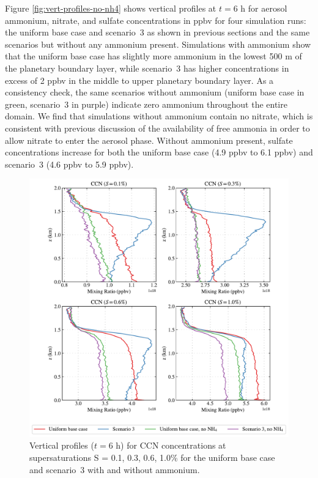 Figure \ref{fig:vert-profiles-no-nh4} shows vertical profiles at $t=6$ h for aerosol ammonium, nitrate, and sulfate concentrations in ppbv for four simulation runs: the uniform base case and scenario~3 as shown in previous sections and the same scenarios but without any ammonium present. Simulations with ammonium show that the uniform base case has slightly more ammonium in the lowest 500 m of the planetary boundary layer, while scenario~3 has higher concentrations in excess of 2 ppbv in the middle to upper planetary boundary layer. As a consistency check, the same scenarios without ammonium (uniform base case in green, scenario~3 in purple) indicate zero ammonium throughout the entire domain. We find that simulations without ammonium contain no nitrate, which is consistent with previous discussion of the availability of free ammonia in order to allow nitrate to enter the aerosol phase. Without ammonium present, sulfate concentrations increase for both the uniform base case (4.9 ppbv to 6.1 ppbv) and scenario~3 (4.6 ppbv to 5.9 ppbv).

\begin{figure}[!t]
  \centering
    \includegraphics[width=\textwidth]{figures/chapter5/aerosol-ccn-vertical-profiles-no-nh4-cases-time36.pdf}
    \caption{Vertical profiles ($t = 6$ h) for CCN concentrations at supersaturations S = 0.1, 0.3, 0.6, 1.0\% for the uniform base case and scenario~3 with and without ammonium.}
    \label{fig:vert-profiles-ccn-no-nh4}
\end{figure}

